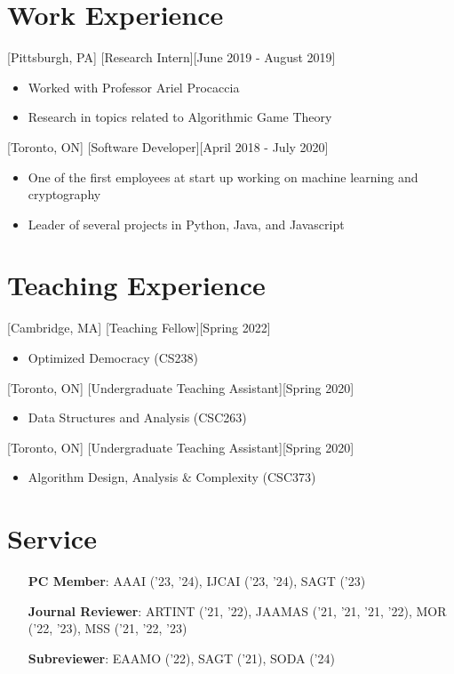 \documentclass{article}
\begin{document}
    \section{Work Experience}
    [Pittsburgh, PA]
    [Research Intern][June 2019 - August 2019]
    \begin{itemize}[noitemsep,nolistsep]
        \item Worked with Professor Ariel Procaccia
        \item Research in topics related to Algorithmic Game Theory
    \end{itemize}

    [Toronto, ON]
    [Software Developer][April 2018 - July 2020]
    \begin{itemize}[noitemsep,nolistsep]
        \item One of the first employees at start up working on machine learning and cryptography
        \item Leader of several projects in Python, Java, and Javascript
    \end{itemize}

    
    \section{Teaching Experience}
    [Cambridge, MA]
    [Teaching Fellow][Spring 2022]
    \begin{itemize}
        \item Optimized Democracy (CS238)
    \end{itemize}
    
    [Toronto, ON]
    [Undergraduate Teaching Assistant][Spring 2020]
    \begin{itemize}
        \item Data Structures and Analysis (CSC263)
    \end{itemize}

    [Toronto, ON]
    [Undergraduate Teaching Assistant][Spring 2020]
    \begin{itemize}
        \item Algorithm Design, Analysis \& Complexity (CSC373)
    \end{itemize}
    
    \section{Service}
    \begin{enumerate}[align=left]
    	\item[\textbf{PC Member}:] AAAI ('23, '24), IJCAI ('23, '24), SAGT ('23)
    	\item[\textbf{Journal Reviewer}:] ARTINT ('21, '22), JAAMAS ('21, '21, '21, '22), MOR ('22, '23), MSS ('21, '22, '23)
    	\item[\textbf{Subreviewer}:] EAAMO ('22), SAGT ('21), SODA ('24)
    \end{enumerate}
    
\end{document}
